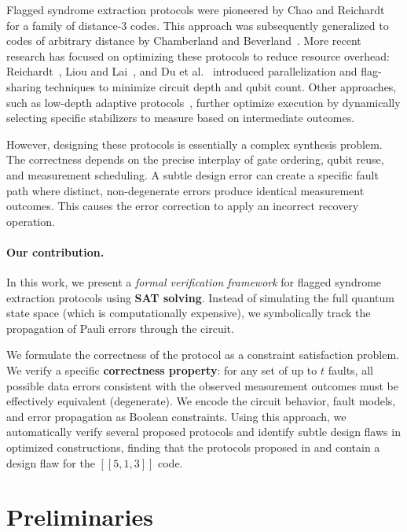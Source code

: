 \documentclass[acmsmallw,review]{acmart}
\newcommand{\bw}[1]{}
\begin{document}
Flagged syndrome extraction protocols were pioneered by Chao and Reichardt~\cite{CR18a} for a family of distance-3 codes. This approach was subsequently generalized to codes of arbitrary distance by Chamberland and Beverland~\cite{CB18}. More recent research has focused on optimizing these protocols to reduce resource overhead: Reichardt~\cite{reichardt2021fault}, Liou and Lai~\cite{LL23,Liou25}, and Du et al.~\cite{Du24} introduced parallelization and flag-sharing techniques to minimize circuit depth and qubit count. Other approaches, such as low-depth adaptive protocols~\cite{low-depth}, further optimize execution by dynamically selecting specific stabilizers to measure based on intermediate outcomes.

However, designing these protocols is essentially a complex synthesis problem. The correctness depends on the precise interplay of gate ordering, qubit reuse, and measurement scheduling. A subtle design error can create a specific fault path where distinct, non-degenerate errors produce identical measurement outcomes. This causes the error correction to apply an incorrect recovery operation.

\paragraph{\textbf{Our contribution.}}
In this work, we present a \emph{formal verification framework} for flagged syndrome extraction protocols using \textbf{SAT solving}. Instead of simulating the full quantum state space (which is computationally expensive), we symbolically track the propagation of Pauli errors through the circuit.

We formulate the correctness of the protocol as a constraint satisfaction problem. We verify a specific \textbf{correctness property}: for any set of up to $t$ faults, all possible data errors consistent with the observed measurement outcomes must be effectively equivalent (degenerate). We encode the circuit behavior, fault models, and error propagation as Boolean constraints. Using this approach, we automatically verify several proposed protocols and identify subtle design flaws in optimized constructions, finding that the protocols proposed in \cite{Liou25} and  \cite{low-depth} contain a design flaw for the $[[5,1,3]]$ code. \bw{more about finding bug}

\section{Preliminaries}
\end{document}
